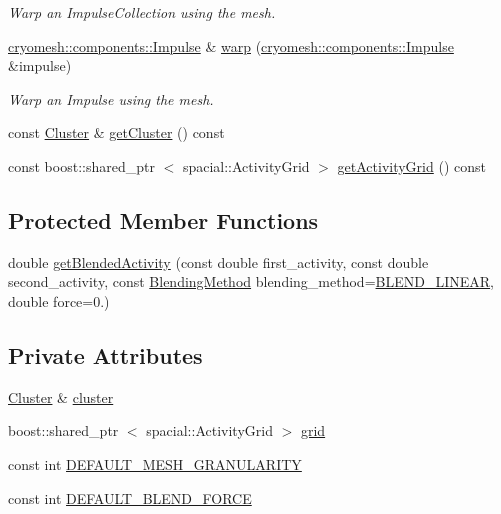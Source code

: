 \begin{DoxyCompactItemize}
\begin{DoxyCompactList}\small\item\em \-Warp an \-Impulse\-Collection using the mesh. \end{DoxyCompactList}\item 
\hyperlink{classcryomesh_1_1components_1_1Impulse}{cryomesh\-::components\-::\-Impulse} \& \hyperlink{classcryomesh_1_1structures_1_1Mesh_a8e04bfe94511b2532f7847db58443ff5}{warp} (\hyperlink{classcryomesh_1_1components_1_1Impulse}{cryomesh\-::components\-::\-Impulse} \&impulse)
\begin{DoxyCompactList}\small\item\em \-Warp an \-Impulse using the mesh. \end{DoxyCompactList}\item 
const \hyperlink{classcryomesh_1_1structures_1_1Cluster}{\-Cluster} \& \hyperlink{classcryomesh_1_1structures_1_1Mesh_a4dd11ae677f2337314378338993d79f7}{get\-Cluster} () const 
\item 
const boost\-::shared\-\_\-ptr\*
$<$ spacial\-::\-Activity\-Grid $>$ \hyperlink{classcryomesh_1_1structures_1_1Mesh_a8e3ffde2dccc774da89e523fc2965333}{get\-Activity\-Grid} () const 
\end{DoxyCompactItemize}
\subsection*{\-Protected \-Member \-Functions}
\begin{DoxyCompactItemize}
\item 
double \hyperlink{classcryomesh_1_1structures_1_1Mesh_af42af644c8d5b4b46bf4006a4e3b0b21}{get\-Blended\-Activity} (const double first\-\_\-activity, const double second\-\_\-activity, const \hyperlink{classcryomesh_1_1structures_1_1Mesh_a5899ce5c4ac651fe82d0bd7b25d4b743}{\-Blending\-Method} blending\-\_\-method=\hyperlink{classcryomesh_1_1structures_1_1Mesh_a5899ce5c4ac651fe82d0bd7b25d4b743a9e12dc9ac54b6b1eadbe806b90caf332}{\-B\-L\-E\-N\-D\-\_\-\-L\-I\-N\-E\-A\-R}, double force=0.)
\end{DoxyCompactItemize}
\subsection*{\-Private \-Attributes}
\begin{DoxyCompactItemize}
\item 
\hyperlink{classcryomesh_1_1structures_1_1Cluster}{\-Cluster} \& \hyperlink{classcryomesh_1_1structures_1_1Mesh_abcb6d0f863592f641cb5f8801d268fa2}{cluster}
\item 
boost\-::shared\-\_\-ptr\*
$<$ spacial\-::\-Activity\-Grid $>$ \hyperlink{classcryomesh_1_1structures_1_1Mesh_a6a93097e85b79b2b5073d1a580ffea25}{grid}
\item 
const int \hyperlink{classcryomesh_1_1structures_1_1Mesh_a3a748cc09c8a337d6cb4087a44255ece}{\-D\-E\-F\-A\-U\-L\-T\-\_\-\-M\-E\-S\-H\-\_\-\-G\-R\-A\-N\-U\-L\-A\-R\-I\-T\-Y}
\item 
const int \hyperlink{classcryomesh_1_1structures_1_1Mesh_a1f56ed809a278be7c36d96a46e33549a}{\-D\-E\-F\-A\-U\-L\-T\-\_\-\-B\-L\-E\-N\-D\-\_\-\-F\-O\-R\-C\-E}
\end{DoxyCompactItemize}


